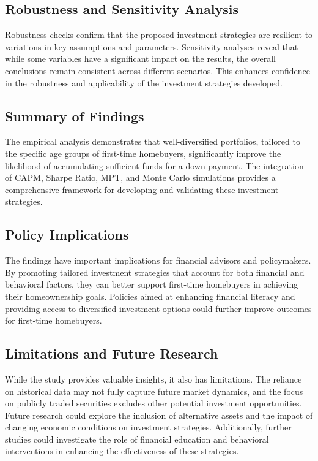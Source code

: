 \subsection{Robustness and Sensitivity Analysis}
Robustness checks confirm that the proposed investment strategies are resilient to variations in key assumptions and parameters. Sensitivity analyses reveal that while some variables have a significant impact on the results, the overall conclusions remain consistent across different scenarios. This enhances confidence in the robustness and applicability of the investment strategies developed.

\subsection{Summary of Findings}
The empirical analysis demonstrates that well-diversified portfolios, tailored to the specific age groups of first-time homebuyers, significantly improve the likelihood of accumulating sufficient funds for a down payment. The integration of CAPM, Sharpe Ratio, MPT, and Monte Carlo simulations provides a comprehensive framework for developing and validating these investment strategies.

\subsection{Policy Implications}
The findings have important implications for financial advisors and policymakers. By promoting tailored investment strategies that account for both financial and behavioral factors, they can better support first-time homebuyers in achieving their homeownership goals. Policies aimed at enhancing financial literacy and providing access to diversified investment options could further improve outcomes for first-time homebuyers.

\subsection{Limitations and Future Research}
While the study provides valuable insights, it also has limitations. The reliance on historical data may not fully capture future market dynamics, and the focus on publicly traded securities excludes other potential investment opportunities. Future research could explore the inclusion of alternative assets and the impact of changing economic conditions on investment strategies. Additionally, further studies could investigate the role of financial education and behavioral interventions in enhancing the effectiveness of these strategies.

